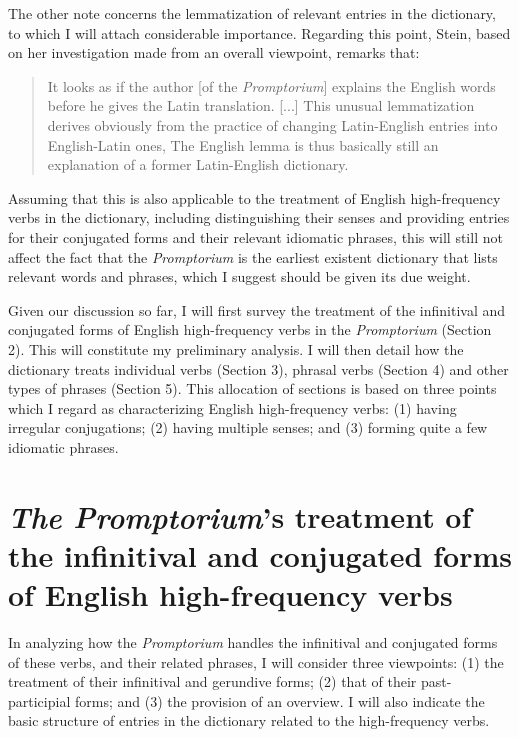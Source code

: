 \documentclass[output=paper,colorlinks,citecolor=brown,arabicfont,chinesefont]{langscibook}
\begin{document}
The other note concerns the lemmatization of relevant entries in the dictionary, to which I will attach considerable importance. Regarding this point, Stein, based on her investigation made from an overall viewpoint, remarks that: 

\begin{quote}
    It looks as if the author [of the \emph{Promptorium}] explains the English words before he gives the Latin translation. [...] This unusual lemmatization derives obviously from the practice of changing Latin-English entries into English-Latin ones, The English lemma is thus basically still an explanation of a former Latin-English dictionary.\hfill\citep[98--99]{Stein1985}\hbox{}
\end{quote}

Assuming that this is also applicable to the treatment of English high-frequency verbs in the dictionary, including distinguishing their senses and providing entries for their conjugated forms and their relevant idiomatic phrases, this will still not affect the fact that the \emph{Promptorium} is the earliest existent dictionary that lists relevant words and phrases, which I suggest should be given its due weight.

Given our discussion so far, I will first survey the treatment of the infinitival and conjugated forms of English high-frequency verbs in the \textit{Promptorium} (Section 2). This will constitute my preliminary analysis. I will then detail how the dictionary treats individual verbs (Section 3), phrasal verbs (Section 4) and other types of phrases (Section 5). This allocation of sections is based on three points which I regard as characterizing English high-frequency verbs: (1) having irregular conjugations; (2) having multiple senses; and (3) forming quite a few idiomatic phrases.

\section{\textit{The Promptorium}'s treatment of the infinitival and conjugated forms of English high-frequency verbs}

In analyzing how the \emph{Promptorium} handles the infinitival and conjugated forms of these verbs, and their related phrases, I will consider three viewpoints: (1) the treatment of their infinitival and gerundive forms; (2) that of their past-participial forms; and (3) the provision of an overview. I will also indicate the basic structure of entries in the dictionary related to the high-frequency verbs.
\end{document}
